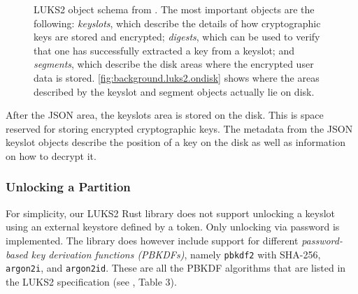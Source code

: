 \begin{figure}[htb!]
	\center
	\caption[
		LUKS2 object schema
	]{
		LUKS2 object schema from \cite{Broz2018}. The most important objects are the following: \emph{keyslots}, which describe the details of how cryptographic keys are stored and encrypted; \emph{digests}, which can be used to verify that one has successfully extracted a key from a keyslot; and \emph{segments}, which describe the disk areas where the encrypted user data is stored. \autoref{fig:background.luks2.ondisk} shows where the areas described by the keyslot and segment objects actually lie on disk.
	}
	\label{fig:background.luks2.jsonobjects}
\end{figure}

After the JSON area, the keyslots area is stored on the disk. This is space reserved for storing encrypted cryptographic keys. The metadata from the JSON keyslot objects describe the position of a key on the disk as well as information on how to decrypt it. 

\subsubsection{Unlocking a Partition}
\label{chap:background.luks2.unlocking}
For simplicity, our LUKS2 Rust library does not support unlocking a keyslot using an external keystore defined by a token. Only unlocking via password is implemented. The library does however include support for different \emph{password-based key derivation functions (PBKDFs)}, namely \texttt{pbkdf2} with SHA-256, \texttt{argon2i}, and \texttt{argon2id}. These are all the PBKDF algorithms that are listed in the LUKS2 specification (see \cite{Broz2018}, Table 3).

